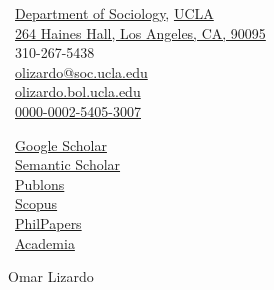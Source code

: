 \documentclass[10pt]{article}
\makeatletter
\def\myemail{olizardo@soc.ucla.edu}
\def\myweb{http://olizardo.bol.ucla.edu}
\def\myphone{310-267-5438}
\makeatother
\begin{document}
\begin{minipage}[t]{3in}
    \small
    \faUniversity \, \href{https://soc.ucla.edu}{Department of Sociology}, \href{https://ucla.edu}{UCLA} \\
    \faLocationArrow \, \href{https://goo.gl/maps/Ge1pAsh17ANWcdRB7}{264 Haines Hall, Los Angeles, CA, 90095} \\
    \faPhone \, \myphone  \\ 
    \faEnvelope \, \href{mailto:\myemail}{\myemail} \\
    \faGlobe \, \href{\myweb}{olizardo.bol.ucla.edu} \\
    \aiOrcid \, \href{https://orcid.org/0000-0002-5405-3007}{0000-0002-5405-3007} \\
\end{minipage}
\hfill     
\hfill
\begin{minipage}[t]{3in}
    \flushleft
    \small 
    \aiGoogleScholar \,  \href{https://scholar.google.com/citations?user=Lt5nMNkAAAAJ&hl=en}{Google Scholar} \\
    \aiSemanticScholar \, \href{https://www.semanticscholar.org/author/Omar-Lizardo/2632398}{Semantic Scholar} \\
    \aiPublons \, \href{https://publons.com/researcher/1372654/omar-lizardo}{Publons} \\
    \aiElsevier \, \href{https://www.scopus.com/authid/detail.uri?authorId=6508228764}{Scopus} \\
    \aiPhilPapers \, \href{https://philpeople.org/profiles/omar-lizardo}{PhilPapers} \\
    \aiAcademia \, \href{https://ucla.academia.edu/OmarLizardo}{Academia}
    \
\end{minipage}
\bigskip
\bigskip

\newcommand{\myname}{ \noindent}
\begin{center}
    {\myname  Omar Lizardo}
\end{center}
\end{document}
